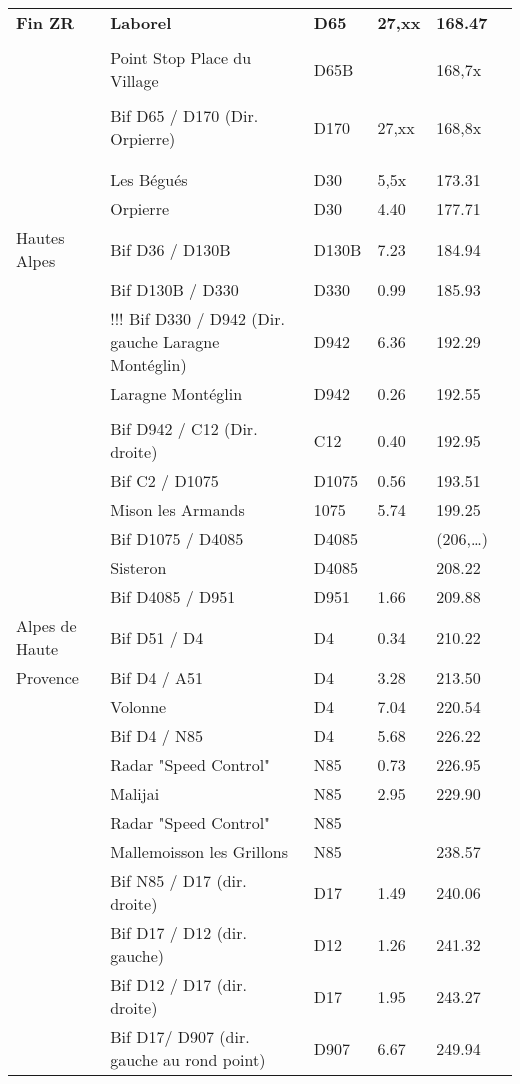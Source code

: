 \documentclass{article}%
\begin{document}
\begin{longtable}{p{2.25cm}|p{6.7cm}|p{2.0cm}|p{1.5cm}|p{1.5cm}|p{3.5cm}}
\textbf{Fin ZR}&\textbf{Laborel }&\textbf{D65}&\textbf{27,xx}&\textbf{168.47}& \\%
 & & & & & \\%
 &Point Stop Place du Village&D65B& &168,7x& \\%
 & & & & & \\%
 &Bif D65 / D170  (Dir. Orpierre)&D170&27,xx&168,8x& \\%
 & & & & & \\%
\hline& & & & & \\%
 &Les Bégués &D30&5,5x&173.31& \\%
 &Orpierre&D30&4.40&177.71& \\%
Hautes Alpes&Bif D36 / D130B&D130B&7.23&184.94& \\%
 &Bif D130B / D330&D330&0.99&185.93& \\%
 &!!! Bif D330 / D942 (Dir. gauche Laragne Montéglin)&D942&6.36&192.29& \\%
 &Laragne Montéglin&D942 &0.26&192.55& \\%
\hline& & & & & \\%
 &Bif D942 / C12 (Dir. droite)&C12&0.40&192.95& \\%
 &Bif C2 / D1075&D1075&0.56&193.51& \\%
 &Mison les Armands&1075&5.74&199.25& \\%
 &Bif D1075 / D4085&D4085& &(206,…)& \\%
 &Sisteron&D4085& &208.22& \\%
 &Bif D4085 / D951&D951&1.66&209.88& \\%
Alpes de Haute&Bif D51 / D4&D4&0.34&210.22& \\%
Provence&Bif D4 / A51 &D4&3.28&213.50& \\%
 &Volonne&D4&7.04&220.54& \\%
 &Bif D4 / N85&D4&5.68&226.22& \\%
 &Radar "Speed Control"&N85&0.73&226.95& \\%
 &Malijai&N85&2.95&229.90& \\%
 &Radar "Speed Control"&N85& & & \\%
 &Mallemoisson les Grillons&N85& &238.57& \\%
 &Bif N85 / D17 (dir. droite)&D17&1.49&240.06& \\%
 &Bif D17 / D12 (dir. gauche)&D12&1.26&241.32& \\%
 &Bif D12 / D17 (dir. droite)&D17&1.95&243.27& \\%
 &Bif D17/ D907 (dir. gauche au rond point)&D907&6.67&249.94& \\%

\end{longtable}
\end{document}
